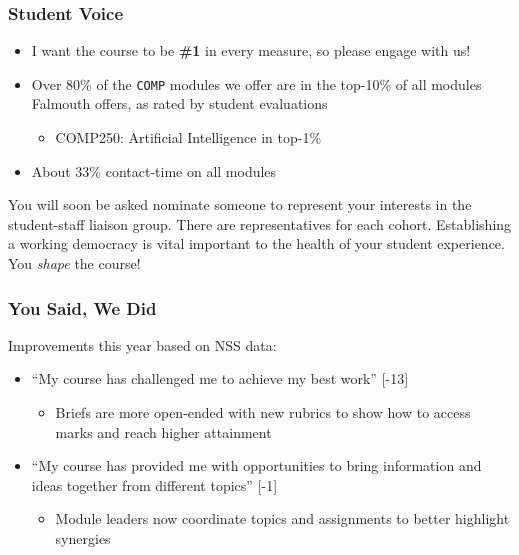 \begin{frame}
	\frametitle{Student Voice}
			
	\begin{itemize}
		\item I want the course to be \textbf{\#1} in every measure, so please engage with us!
		\item Over 80\% of the \texttt{COMP} modules we offer are in the top-10\% of all modules Falmouth offers, as rated by student evaluations 
		\begin{itemize}
			\item COMP250: Artificial Intelligence in top-1\% 
		\end{itemize}	
		\item About 33\% contact-time on all modules
	\end{itemize}
	
	\vspace{1em}
	
	You will soon be asked nominate someone to represent your interests in the student-staff liaison group. There are representatives for each cohort. 
	Establishing a working democracy is vital important to the health of your student experience. You \textit{shape} the course!
	
\end{frame}

\begin{frame}
	\frametitle{You Said, We Did}
	
	Improvements this year based on NSS data: \pause
		
	\begin{itemize}
		\item ``My course has challenged me to achieve my best work'' [-13] 
		\begin{itemize}
			\item Briefs are more open-ended with new rubrics to show how to access marks and reach higher attainment
		\end{itemize}	
		
		\pause\item ``My course has provided me with opportunities to bring information and ideas together from different topics'' [-1]
		\begin{itemize}
			\item Module leaders now coordinate topics and assignments to better highlight synergies 
		\end{itemize}	
		
	\end{itemize}
\end{frame}


